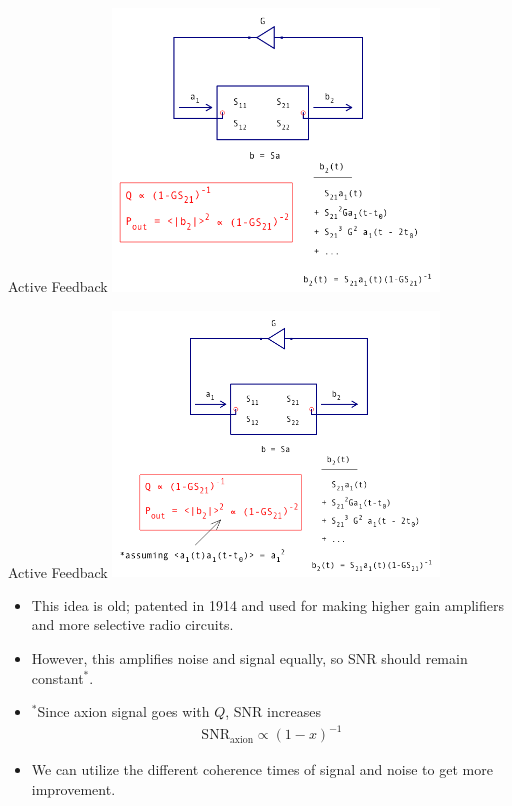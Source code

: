 \documentclass{beamer}
\begin{document}
\begin{frame}{Active Feedback}
\centering
\includegraphics[width=0.65\textwidth]{export_sparams_13}
\end{frame}

\begin{frame}{Active Feedback}
\centering
\includegraphics[width=0.65\textwidth]{export_sparams_14}
\end{frame}

\begin{frame}
\begin{itemize}
\item This idea is old; patented in 1914 and used for making higher gain amplifiers and more selective radio circuits. 

\item However, this amplifies noise and signal equally, so SNR should remain constant$^{*}$.

\item ${^*}$Since axion signal goes with $Q$, SNR increases
\begin{align*}
\text{SNR}_{\text{axion}} \propto (1-x)^{-1}
\end{align*}
\item We can utilize the different coherence times of signal and noise to get more improvement.
\end{itemize}
\end{frame}
\end{document}
